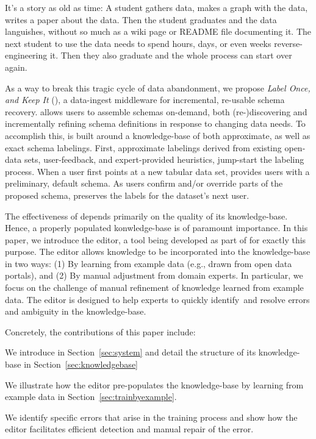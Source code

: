 
It's a story as old as time: A student gathers data, makes a graph with the data, writes a paper about the data.
Then the student graduates and the data languishes, without so much as a wiki page or README file documenting it.
The next student to use the data needs to spend hours, days, or even weeks reverse-engineering it.
Then they also graduate and the whole process can start over again.

As a way to break this tragic cycle of data abandonment, we propose \emph{Label Once, and Keep It} (\systemname), a data-ingest middleware for incremental, re-usable schema recovery.
\systemname allows users to assemble schemas on-demand, both (re-)discovering and incrementally refining schema definitions in response to changing data needs.  
To accomplish this, \systemname is built around a knowledge-base of both approximate, as well as exact schema labelings.
First, approximate labelings derived from existing open-data sets, user-feedback, and expert-provided heuristics, jump-start the labeling process.
When a user first points \systemname at a new tabular data set, \systemname provides users with a preliminary, default schema.
As users confirm and/or override parts of the proposed schema, \systemname preserves the labels for the dataset's next user.

The effectiveness of \systemname depends primarily on the quality of its knowledge-base.  
Hence, a properly populated konwledge-base is of paramount importance.
In this paper, we introduce the \systemname editor, a tool being developed as part of \systemname for exactly this purpose.
The \systemname editor allows knowledge to be incorporated into the knowledge-base in two ways: (1) By learning from example data (e.g., drawn from open data portals), and (2) By manual adjustment from domain experts.
In particular, we focus on the challenge of manual refinement of knowledge learned from example data.
The editor is designed to help experts to quickly identify and resolve errors and ambiguity in the \systemname knowledge-base.

Concretely, the contributions of this paper include:
\begin{enumerate*}
  \item We introduce \systemname in Section~\ref{sec:system} and detail the structure of its knowledge-base in Section~\ref{sec:knowledgebase}
  \item We illustrate how the \systemname editor pre-populates the knowledge-base by learning from example data in Section~\ref{sec:trainbyexample}.
  \item We identify specific errors that arise in the training process and show how the \systemname editor facilitates efficient detection and manual repair of the error.
\end{enumerate*}

